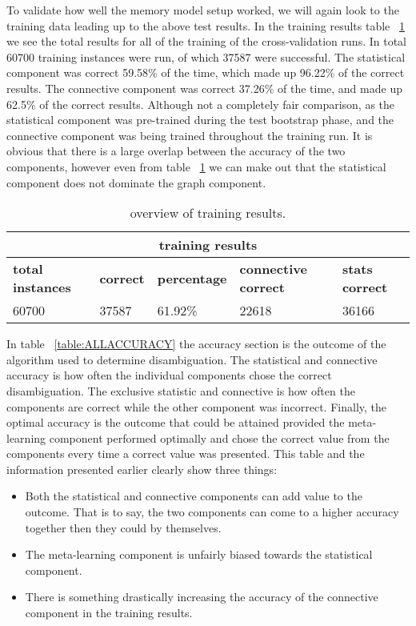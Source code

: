 To validate how well the memory model setup worked, we will again look to the training data leading up to the above test results.  In the training results table ~\ref{table:TRAININGRESULTS} we see the total results for all of the training of the cross-validation runs.  In total 60700 training instances were run, of which 37587 were successful.  The statistical component was correct 59.58\% of the time, which made up 96.22\% of the correct results.  The connective component was correct 37.26\% of the time, and made up 62.5\% of the correct results.  Although not a completely fair comparison, as the statistical component was pre-trained during the test bootstrap phase, and the connective component was being trained throughout the training run.  It is obvious that there is a large overlap between the accuracy of the two components, however even from table ~\ref{table:TRAININGRESULTS} we can make out that the statistical component does not dominate the graph component.

\begin{table}[htp]
	\begin{tabular}{|l|l|l|l|l|}
		\hline
			\multicolumn{5}{|c|}{\bf training results } \\
		\hline
		{\bf total instances} & {\bf correct } & {\bf percentage} & {\bf connective correct } & {\bf stats correct } \\ \hline 
		60700				  & 37587		   & 61.92\%		  & 22618				  & 36166    \\ \hline 
	\end{tabular}
	\caption{overview of training results.}
	\label{table:TRAININGRESULTS}
\end{table}

In table ~\ref{table:ALLACCURACY} the accuracy section is the outcome of the algorithm used to determine disambiguation. The statistical and connective accuracy is how often the individual components chose the correct disambiguation.  The exclusive statistic and connective is how often the components are correct while the other component was incorrect.  Finally, the optimal accuracy is the outcome that could be attained provided the meta-learning component performed optimally and chose the correct value from the components every time a correct value was presented. This table and the information presented earlier clearly show three things:
\begin{itemize}
	\item Both the statistical and connective components can add value to the outcome. That is to say, the two components can come to a higher accuracy together then they could by themselves.
	\item The meta-learning component is unfairly biased towards the statistical component.
	\item There is something drastically increasing the accuracy of the connective component in the training results.
\end{itemize}

